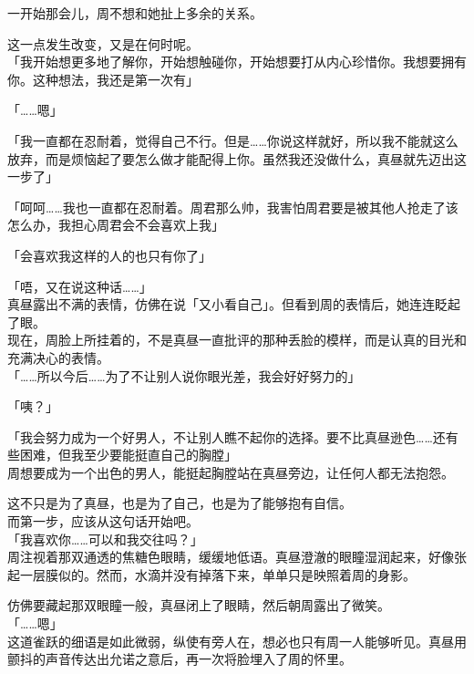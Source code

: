一开始那会儿，周不想和她扯上多余的关系。

这一点发生改变，又是在何时呢。\\

「我开始想更多地了解你，开始想触碰你，开始想要打从内心珍惜你。我想要拥有你。这种想法，我还是第一次有」

「……嗯」

「我一直都在忍耐着，觉得自己不行。但是……你说这样就好，所以我不能就这么放弃，而是烦恼起了要怎么做才能配得上你。虽然我还没做什么，真昼就先迈出这一步了」

「呵呵……我也一直都在忍耐着。周君那么帅，我害怕周君要是被其他人抢走了该怎么办，我担心周君会不会喜欢上我」

「会喜欢我这样的人的也只有你了」

「唔，又在说这种话……」\\

真昼露出不满的表情，仿佛在说「又小看自己」。但看到周的表情后，她连连眨起了眼。\\

现在，周脸上所挂着的，不是真昼一直批评的那种丢脸的模样，而是认真的目光和充满决心的表情。\\

「……所以今后……为了不让别人说你眼光差，我会好好努力的」

「咦？」

「我会努力成为一个好男人，不让别人瞧不起你的选择。要不比真昼逊色……还有些困难，但我至少要能挺直自己的胸膛」\\

周想要成为一个出色的男人，能挺起胸膛站在真昼旁边，让任何人都无法抱怨。

这不只是为了真昼，也是为了自己，也是为了能够抱有自信。\\

而第一步，应该从这句话开始吧。\\

「我喜欢你……可以和我交往吗？」\\

周注视着那双通透的焦糖色眼睛，缓缓地低语。真昼澄澈的眼瞳湿润起来，好像张起一层膜似的。然而，水滴并没有掉落下来，单单只是映照着周的身影。

仿佛要藏起那双眼瞳一般，真昼闭上了眼睛，然后朝周露出了微笑。\\

「……嗯」\\

这道雀跃的细语是如此微弱，纵使有旁人在，想必也只有周一人能够听见。真昼用颤抖的声音传达出允诺之意后，再一次将脸埋入了周的怀里。

